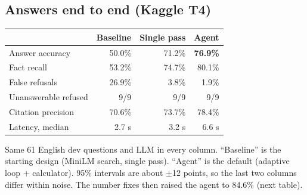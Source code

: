 \documentclass[10pt,a4paper]{article}
\newcommand{\note}[1]{{\raggedright\color{muted}\fontsize{8.3}{10}\selectfont #1\par}}
\begin{document}
\begin{minipage}[t]{0.47\textwidth}
\subsection{Answers end to end (Kaggle T4)}
\renewcommand{\arraystretch}{1.22}
{\fontsize{8.4}{10.2}\selectfont
\begin{tabularx}{\linewidth}{@{}X r r r@{}}
\toprule
 & \textbf{Baseline} & \textbf{Single pass} & \textbf{Agent} \\ \midrule
Answer accuracy      & 50.0\% & 71.2\% & \textbf{76.9\%} \\
Fact recall          & 53.2\% & 74.7\% & 80.1\% \\
False refusals       & 26.9\% & 3.8\%  & 1.9\% \\
Unanswerable refused & 9/9    & 9/9    & 9/9 \\
Citation precision   & 70.6\% & 73.7\% & 78.4\% \\
Latency, median      & 2.7 s  & 3.2 s  & 6.6 s \\
\bottomrule
\end{tabularx}}
\note{Same 61 English dev questions and LLM in every column. ``Baseline'' is the starting design (MiniLM search, single pass).
``Agent'' is the default (adaptive loop + calculator). 95\% intervals are about $\pm$12 points, so the last two columns differ within noise.
The number fixes then raised the agent to 84.6\% (next table).}
\end{minipage}
\end{document}
